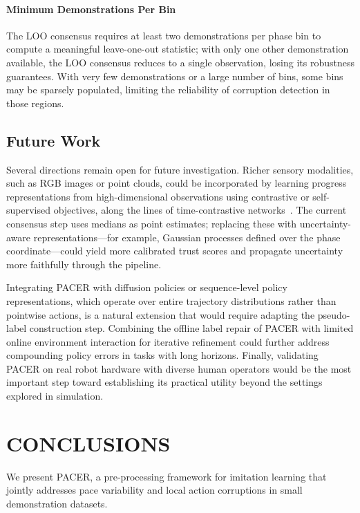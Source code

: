 \documentclass[a4paper, 10pt, conference]{ieeeconf}
\begin{document}
\paragraph{Minimum Demonstrations Per Bin}
The LOO consensus requires at least two demonstrations per phase bin to compute a meaningful leave-one-out statistic; with only one other demonstration available, the LOO consensus reduces to a single observation, losing its robustness guarantees.
With very few demonstrations or a large number of bins, some bins may be sparsely populated, limiting the reliability of corruption detection in those regions.

\subsection{Future Work}

Several directions remain open for future investigation.
Richer sensory modalities, such as RGB images or point clouds, could be incorporated by learning progress representations from high-dimensional observations using contrastive or self-supervised objectives, along the lines of time-contrastive networks~\cite{sermanet2018tcn}.
The current consensus step uses medians as point estimates; replacing these with uncertainty-aware representations---for example, Gaussian processes defined over the phase coordinate---could yield more calibrated trust scores and propagate uncertainty more faithfully through the pipeline.

Integrating PACER with diffusion policies or sequence-level policy representations, which operate over entire trajectory distributions rather than pointwise actions, is a natural extension that would require adapting the pseudo-label construction step.
Combining the offline label repair of PACER with limited online environment interaction for iterative refinement could further address compounding policy errors in tasks with long horizons.
Finally, validating PACER on real robot hardware with diverse human operators would be the most important step toward establishing its practical utility beyond the settings explored in simulation.

\section{CONCLUSIONS}

We present PACER, a pre-processing framework for imitation learning that jointly addresses pace variability and local action corruptions in small demonstration datasets.
\end{document}
